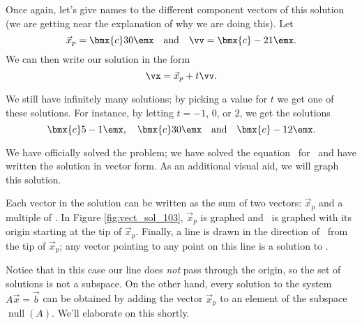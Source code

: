 {Once again, let's give names to the different component vectors of this solution (we are getting near the explanation of why we are doing this). Let 
\[
\vec{x}_p = \bmx{c} 3\\0\emx \quad \text{and} \quad \vv = \bmx{c}-2\\1\emx.
\]
We can then write our solution in the form 
\[
\vx = \vec{x}_p + t\vv.
\]

We still have infinitely many solutions; by picking a value for $t$ we get one of these solutions. For instance, by letting $t= -1$, $0$, or $2$, we get the solutions 
\[
\bmx{c} 5\\-1\emx, \quad \bmx{c} 3\\0\emx \quad \text{and} \quad \bmx{c} -1\\2\emx.
\]


We have officially solved the problem; we have solved the equation \ttaxb\ for \vx\ and have written the solution in vector form. As an additional visual aid, we will graph this solution. 

Each vector in the solution can be written as the sum of two vectors: $\vec{x}_p$ and a multiple of \vv. In Figure \ref{fig:vect_sol_103}, $\vec{x}_p$ is graphed and \vv\ is graphed with its origin starting at the tip of $\vec{x}_p$. Finally, a line is drawn in the direction of \vv\ from the tip of $\vec{x}_p$; any vector pointing to any point on this line is a solution to \ttaxb.


Notice that in this case our line does \textit{not} pass through the origin, so the set of solutions is not a subspace. On the other hand, every solution to the system $A\vec x = \vec b$ can be obtained by adding the vector $\vec{x}_p$ to an element of the subspace $\operatorname{null}(A)$. We'll elaborate on this shortly.
}

